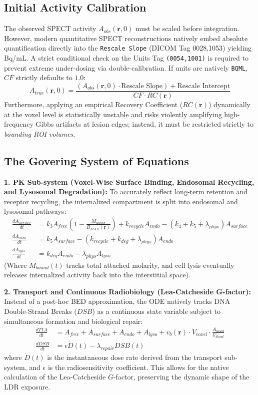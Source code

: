 \documentclass[11pt,a4paper]{article}
\begin{document}
\subsection{Initial Activity Calibration}
The observed SPECT activity $A_{obs}(\mathbf{r}, 0)$ must be scaled before integration. However, modern quantitative SPECT reconstructions natively embed absolute quantification directly into the \texttt{Rescale Slope} (DICOM Tag 0028,1053) yielding Bq/mL. A strict conditional check on the Units Tag \texttt{(0054,1001)} is required to prevent extreme under-dosing via double-calibration. If units are natively \texttt{BQML}, $CF$ strictly defaults to $1.0$:
\begin{equation}
    A_{true}(\mathbf{r}, 0) = \frac{\left( A_{obs}(\mathbf{r}, 0) \cdot \text{Rescale Slope} \right) + \text{Rescale Intercept}}{CF \cdot RC(\mathbf{r})}
\end{equation}
Furthermore, applying an empirical Recovery Coefficient ($RC(\mathbf{r})$) dynamically at the voxel level is statistically unstable and risks violently amplifying high-frequency Gibbs artifacts at lesion edges; instead, it must be restricted strictly to \textit{bounding ROI volumes}.

\subsection{The Govering System of Equations}
\textbf{1. PK Sub-system (Voxel-Wise Surface Binding, Endosomal Recycling, and Lysosomal Degradation):}
To accurately reflect long-term retention and receptor recycling, the internalized compartment is split into endosomal and lysosomal pathways:
\begin{align}
    \frac{dA_{surface}}{dt} &= k_3 A_{free} \left( 1 - \frac{M_{bound}}{B_{MAX}(\mathbf{r})} \right) + k_{recycle} A_{endo} - (k_4 + k_5 + \lambda_{phys}) A_{surface} \\
    \frac{dA_{endo}}{dt} &= k_5 A_{surface} - (k_{recycle} + k_{deg} + \lambda_{phys}) A_{endo} \\
    \frac{dA_{lyso}}{dt} &= k_{deg} A_{endo} - \lambda_{phys} A_{lyso}
\end{align}
(Where $M_{bound}(t)$ tracks total attached molarity, and cell lysis eventually releases internalized activity back into the interstitial space).

\textbf{2. Transport and Continuous Radiobiology (Lea-Catcheside G-factor):}
Instead of a post-hoc BED approximation, the ODE natively tracks DNA Double-Strand Breaks ($DSB$) as a continuous state variable subject to simultaneous formation and biological repair:
\begin{align}
    \frac{dTIA}{dt} &= A_{free} + A_{surface} + A_{endo} + A_{lyso} + v_b(\mathbf{r}) \cdot V_{voxel} \cdot \frac{A_{blood}}{V_{blood}} \\
    \frac{dDSB}{dt} &= \epsilon \dot{D}(t) - \lambda_{repair} DSB(t)
\end{align}
where $\dot{D}(t)$ is the instantaneous dose rate derived from the transport sub-system, and $\epsilon$ is the radiosensitivity coefficient. This allows for the native calculation of the Lea-Catcheside $G$-factor, preserving the dynamic shape of the LDR exposure.
\end{document}
